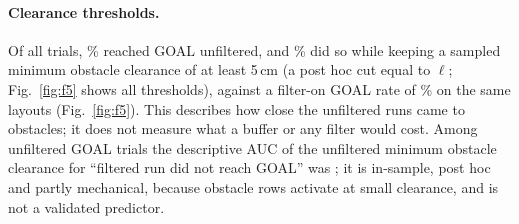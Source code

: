 \documentclass[journal]{IEEEtran}
\begin{document}
\paragraph{Clearance thresholds.} Of all trials, \ThrOffGoal\% reached GOAL unfiltered, and
\ThrMatchObstFive\% did so while keeping a sampled minimum obstacle clearance of at least 5\,cm (a
post hoc cut equal to $\ell$; Fig.~\ref{fig:f5} shows all thresholds),
against a filter-on GOAL rate of \ThrOnGoal\% on the same layouts (Fig.~\ref{fig:f5}). This
describes how close the unfiltered runs came to obstacles; it does not measure what a buffer or
any filter would cost. Among unfiltered GOAL trials the descriptive AUC of the unfiltered minimum
obstacle clearance for ``filtered run did not reach GOAL'' was \AucPooled; it is in-sample, post hoc
and partly mechanical, because obstacle rows activate at small clearance, and is not a validated
predictor.
\end{document}
